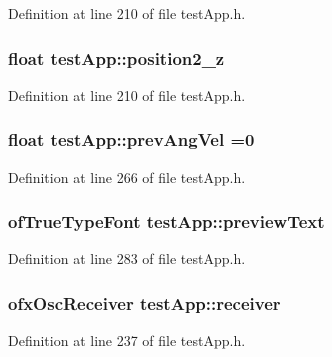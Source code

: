 Definition at line 210 of file test\-App.\-h.

\hypertarget{classtest_app_a0720011cfaade6388109232ea4927c19}{
\subsubsection[{position2\-\_\-z}]{\setlength{\rightskip}{0pt plus 5cm}float test\-App\-::position2\-\_\-z}}\label{classtest_app_a0720011cfaade6388109232ea4927c19}


Definition at line 210 of file test\-App.\-h.

\hypertarget{classtest_app_a8a2b9b9cf76097e20f148b616297029b}{
\subsubsection[{prev\-Ang\-Vel}]{\setlength{\rightskip}{0pt plus 5cm}float test\-App\-::prev\-Ang\-Vel =0}}\label{classtest_app_a8a2b9b9cf76097e20f148b616297029b}


Definition at line 266 of file test\-App.\-h.

\hypertarget{classtest_app_af5b1af55af2256ef3751de075fc7a9cc}{
\subsubsection[{preview\-Text}]{\setlength{\rightskip}{0pt plus 5cm}of\-True\-Type\-Font test\-App\-::preview\-Text}}\label{classtest_app_af5b1af55af2256ef3751de075fc7a9cc}


Definition at line 283 of file test\-App.\-h.

\hypertarget{classtest_app_a034c44ff60fa1e5f021e90d5410ba657}{
\subsubsection[{receiver}]{\setlength{\rightskip}{0pt plus 5cm}ofx\-Osc\-Receiver test\-App\-::receiver}}\label{classtest_app_a034c44ff60fa1e5f021e90d5410ba657}


Definition at line 237 of file test\-App.\-h.

